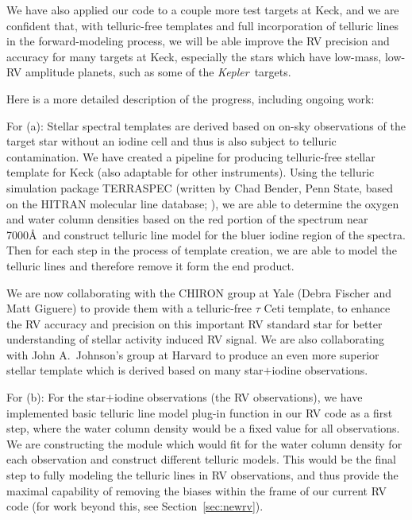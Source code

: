 \documentclass[12pt]{article}
\def\kepler{{\it Kepler}}
\begin{document}
We have also applied our code to a couple more test targets at Keck,
and we are confident that, with telluric-free templates and full
incorporation of telluric lines in the forward-modeling process, we
will be able improve the RV precision and accuracy for many targets at
Keck, especially the stars which have low-mass, low-RV amplitude
planets, such as some of the \kepler\ targets.

Here is a more detailed description of the progress, including ongoing work:

For (a): Stellar spectral templates are derived based on on-sky
observations of the target star without an iodine cell and thus is
also subject to telluric contamination. We have created a pipeline for
producing telluric-free stellar template for Keck (also adaptable for
other instruments). Using the telluric simulation package TERRASPEC
(written by Chad Bender, Penn State, based on the HITRAN molecular
line database; \citealt{hitran2012}), we are able to determine the
oxygen and water column densities based on the red portion of the
spectrum near 7000\AA\ and construct telluric line model for the bluer
iodine region of the spectra. Then for each step in the process of
template creation, we are able to model the telluric lines and
therefore remove it form the end product.

We are now collaborating with the CHIRON group at Yale (Debra Fischer
and Matt Giguere) to provide them with a telluric-free $\tau$ Ceti
template, to enhance the RV accuracy and precision on this important
RV standard star for better understanding of stellar activity induced
RV signal. We are also collaborating with John A.\ Johnson's group at
Harvard to produce an even more superior stellar template which is
derived based on many star$+$iodine observations.

For (b): For the star$+$iodine observations (the RV observations), we
have implemented basic telluric line model plug-in function in our RV
code as a first step, where the water column density would be a fixed
value for all observations. We are constructing the module which would
fit for the water column density for each observation and construct
different telluric models. This would be the final step to fully
modeling the telluric lines in RV observations, and thus provide the
maximal capability of removing the biases within the frame of our
current RV code (for work beyond this, see Section~\ref{sec:newrv}).


\vspace{-10pt}
\end{document}
